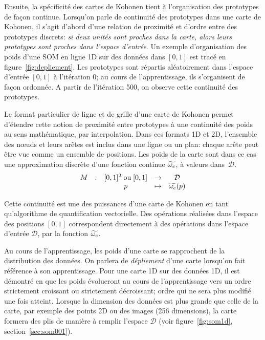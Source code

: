 \documentclass[../main]{subfiles}
\begin{document}
Ensuite, la spécificité des cartes de Kohonen tient à l'organisation des prototypes de façon continue. Lorsqu'on parle de continuité des prototypes dans une carte de Kohonen, il s'agit d'abord d'une relation de proximité et d'ordre entre des prototypes discrets: \emph{si deux unités sont proches dans la carte, alors leurs prototypes sont proches dans l'espace d'entrée}. Un exemple d'organisation des poids d'une SOM en ligne 1D sur des données dans $[0,1]$ est tracé en figure~\ref{fig:depliement}. Les prototypes sont répartis aléatoirement dans l'espace d'entrée $[0,1]$ à l'itération $0$; au cours de l'apprentissage, ils s'organisent de façon ordonnée. A partir de l'itération 500, on observe cette continuité des prototypes.

Le format particulier de ligne et de grille d'une carte de Kohonen permet d'étendre cette notion de proximité entre prototypes à une continuité des poids au sens mathématique, par interpolation. Dans ces formats 1D et 2D, l'ensemble des n\oe{}uds et leurs arêtes est inclus dans une ligne ou un plan: chaque arête peut être vue comme un ensemble de positions. Les poids de la carte sont dans ce cas une approximation discrète d'une fonction continue $\widetilde{\omega_e}$, à valeurs dans~$\mathcal{D}$.
\begin{equation*}
\begin{array}{ccccc}
M& : & [0,1]^2 \; \text{ou} \;[0,1] & \to &  \mathcal{D} \\
 & & p & \mapsto & \widetilde{\omega_e}(p) \\
\end{array}
\end{equation*}

Cette continuité est une des puissances d'une carte de Kohonen en tant qu'algorithme de quantification vectorielle. Des opérations réalisées dans l'espace des positions $[0,1]$ correspondent directement à des opérations dans l'espace d'entrée $\mathcal{D}$, par la fonction $\widetilde{\omega_e}$.

Au cours de l'apprentissage, les poids d'une carte se rapprochent de la distribution des données. On parlera de \emph{dépliement} d'une carte lorsqu'on fait référence à son apprentissage.
Pour une carte 1D sur des données 1D, il est démontré en \cite{Kohonen1995SelfOrganizingM} que les poids évolueront au cours de l'apprentissage vers un ordre strictement croissant ou strictement décroissant; ordre qui ne sera plus modifié une fois atteint. 
Lorsque la dimension des données est plus grande que celle de la carte, par exemple des points 2D ou des images (256 dimensions), la carte formera des plis de manière à remplir l'espace $\mathcal{D}$ (voir figure~\ref{fig:som1d}, section~\ref{sec:som001}). 
\end{document}
